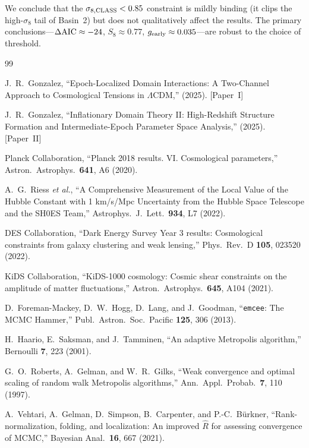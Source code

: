 \documentclass[aps,prd,twocolumn,superscriptaddress,nofootinbib]{revtex4-2}
\newcommand{\dAIC}{\Delta{\rm AIC}}
\newcommand{\gearly}{g_{\rm early}}
\begin{document}
We conclude that the $\sigma_{8,\rm CLASS} < 0.85$ constraint is
mildly binding (it clips the high-$\sigma_8$ tail of Basin~2) but does
not qualitatively affect the results. The primary conclusions---$\dAIC
\approx -24$, $S_8 \approx 0.77$, $\gearly \approx 0.035$---are
robust to the choice of threshold.

\begin{thebibliography}{99}

J.~R.~Gonzalez,
``Epoch-Localized Domain Interactions: A Two-Channel Approach to
Cosmological Tensions in $\Lambda$CDM,''
(2025). [Paper~I]

J.~R.~Gonzalez,
``Inflationary Domain Theory II: High-Redshift Structure Formation and
Intermediate-Epoch Parameter Space Analysis,''
(2025). [Paper~II]

Planck Collaboration,
``Planck 2018 results. VI. Cosmological parameters,''
Astron.\ Astrophys.\ \textbf{641}, A6 (2020).

A.~G.~Riess \textit{et al.},
``A Comprehensive Measurement of the Local Value of the Hubble
Constant with 1 km/s/Mpc Uncertainty from the Hubble Space Telescope
and the SH0ES Team,''
Astrophys.\ J.\ Lett.\ \textbf{934}, L7 (2022).

DES Collaboration,
``Dark Energy Survey Year 3 results: Cosmological constraints from
galaxy clustering and weak lensing,''
Phys.\ Rev.\ D \textbf{105}, 023520 (2022).

KiDS Collaboration,
``KiDS-1000 cosmology: Cosmic shear constraints on the amplitude of
matter fluctuations,''
Astron.\ Astrophys.\ \textbf{645}, A104 (2021).

D.~Foreman-Mackey, D.~W.~Hogg, D.~Lang, and J.~Goodman,
``\texttt{emcee}: The MCMC Hammer,''
Publ.\ Astron.\ Soc.\ Pacific \textbf{125}, 306 (2013).

H.~Haario, E.~Saksman, and J.~Tamminen,
``An adaptive Metropolis algorithm,''
Bernoulli \textbf{7}, 223 (2001).

G.~O.~Roberts, A.~Gelman, and W.~R.~Gilks,
``Weak convergence and optimal scaling of random walk Metropolis
algorithms,''
Ann.\ Appl.\ Probab.\ \textbf{7}, 110 (1997).

A.~Vehtari, A.~Gelman, D.~Simpson, B.~Carpenter, and P.-C.~B\"urkner,
``Rank-normalization, folding, and localization: An improved $\hat{R}$
for assessing convergence of MCMC,''
Bayesian Anal.\ \textbf{16}, 667 (2021).


\end{thebibliography}
\end{document}
